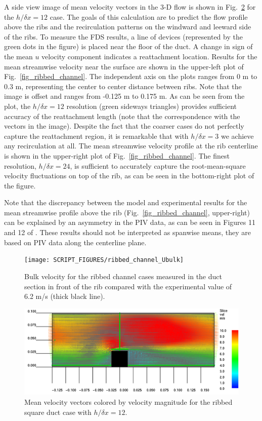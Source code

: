 \documentclass[11pt]{book}
\begin{document}
A side view image of mean velocity vectors in the 3-D flow is shown in Fig.~\ref{fig_ribbed_channel_image} for the $h/\delta x = 12$ case.  The goals of this calculation are to predict the flow profile above the ribs and the recirculation patterns on the windward and leeward side of the ribs.  To measure the FDS results, a line of devices (represented by the green dots in the figure) is placed near the floor of the duct.  A change in sign of the mean $u$ velocity component indicates a reattachment location.  Results for the mean streamwise velocity near the surface are shown in the upper-left plot of Fig.~\ref{fig_ribbed_channel}.  The independent axis on the plots ranges from 0 m to 0.3 m, representing the center to center distance between ribs.  Note that the image is offset and ranges from -0.125 m to 0.175 m.  As can be seen from the plot, the $h/\delta x = 12$ resolution (green sideways triangles) provides sufficient accuracy of the reattachment length (note that the correspondence with the vectors in the image).  Despite the fact that the coarser cases do not perfectly capture the reattachment region, it is remarkable that with $h/\delta x = 3$ we achieve any recirculation at all.  The mean streamwise velocity profile at the rib centerline is shown in the upper-right plot of Fig.~\ref{fig_ribbed_channel}. The finest resolution, $h/\delta x=24$, is sufficient to accurately capture the root-mean-square velocity fluctuations on top of the rib, as can be seen in the bottom-right plot of the figure.

Note that the discrepancy between the model and experimental results for the mean streamwise profile above the rib (Fig.~\ref{fig_ribbed_channel}, upper-right) can be explained by an asymmetry in the PIV data, as can be seen in Figures 11 and 12 of \cite{Casara:2}.  These results should not be interpreted as spanwise means, they are based on PIV data along the centerline plane.

\begin{figure}[ht]
\centering
\texttt{[image: SCRIPT\_FIGURES/ribbed\_channel\_Ubulk]}
\caption[Bulk velocity {\ct ribbed\_channel} test case]{Bulk velocity for the ribbed channel cases measured in the duct section in front of the rib compared with the experimental value of 6.2 m/s (thick black line).}
\label{fig_ribbed_channel_Ubulk}
\end{figure}

\begin{figure}[ht]
\centering
\includegraphics[width=.8\textwidth]{FIGURES/ribbed_channel_vel}
\caption[The {\ct ribbed\_channel} test case]{Mean velocity vectors colored by velocity magnitude for the ribbed square duct case with $h/\delta x = 12$.}
\label{fig_ribbed_channel_image}
\end{figure}
\end{document}
